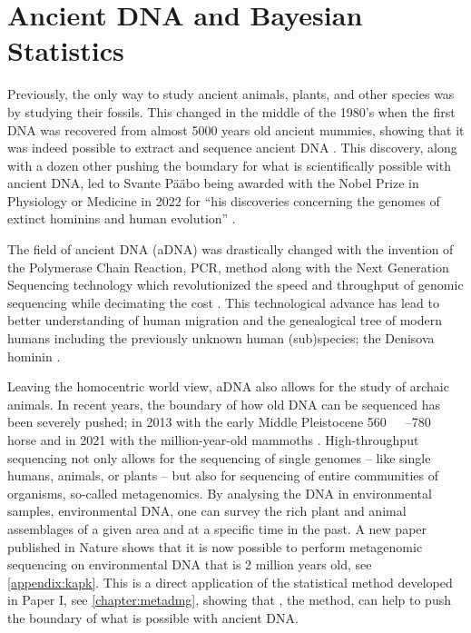 \section{Ancient DNA and Bayesian Statistics}
\label{section:ancientDNA}

Previously, the only way to study ancient animals, plants, and other species was by studying their fossils. This changed in the middle of the 1980's when the first DNA was recovered from almost 5000 years old ancient mummies, showing that it was indeed possible to extract and sequence ancient DNA \autocite{paaboMolecularCloningAncient1985,paaboPreservationDNAAncient1985}. This discovery, along with a dozen other pushing the boundary for what is scientifically possible with ancient DNA, led to Svante Pääbo being awarded with the Nobel Prize in Physiology or Medicine in 2022 for ``his discoveries concerning the genomes of extinct hominins and human evolution'' \autocite{thenobelassemblyatkarolinskainstitutetNobelPrizePhysiology2022}.

The field of ancient DNA (aDNA) was drastically changed with the invention of the Polymerase Chain Reaction, PCR, method \autocite{mullisSpecificEnzymaticAmplification1986} along with the Next Generation Sequencing technology which revolutionized the speed and throughput of genomic sequencing while decimating the cost \autocite{slatkoOverviewNextGeneration2018}. This technological advance has lead to better understanding of human migration and the genealogical tree of modern humans including the previously unknown human (sub)species; the Denisova hominin \autocite{krauseCompleteMitochondrialDNA2010}.

Leaving the homocentric world view, aDNA also allows for the study of archaic animals. In recent years, the boundary of how old DNA can be sequenced has been severely pushed; in 2013 with the early Middle Pleistocene \qtyrange[range-phrase = --,range-units = single]{560}{780}{\kilo\year\BP} horse \autocite{orlandoRecalibratingEquusEvolution2013} and in 2021 with the million-year-old mammoths \autocite{vandervalkMillionyearoldDNASheds2021}. High-throughput sequencing not only allows for the sequencing of single genomes -- like single humans, animals, or plants -- but also for sequencing of entire communities of organisms, so-called metagenomics. By analysing the DNA in environmental samples, environmental DNA, one can survey the rich plant and animal assemblages of a given area and at a specific time in the past. A new paper published in Nature shows that it is now possible to perform metagenomic sequencing on environmental DNA that is 2 million years old, see \autoref{appendix:kapk}. This is a direct application of the statistical method developed in Paper I, see \autoref{chapter:metadmg}, showing that \metaDMG, the method, can help to push the boundary of what is possible with ancient DNA.

